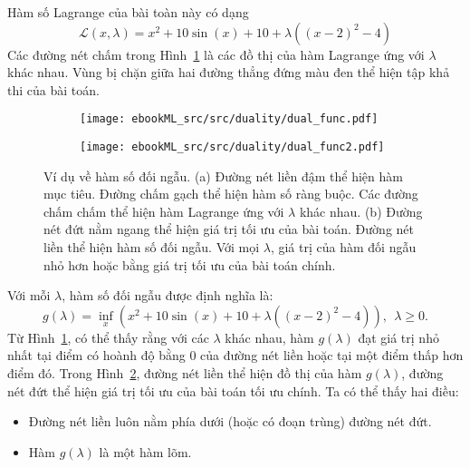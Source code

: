 Hàm số Lagrange của bài toàn này có dạng
\begin{equation*} 
\mathcal{L}(x, \lambda) = x^2 + 10\sin(x) +10+ \lambda((x-2)^2 - 4)  
\end{equation*} 
Các đường nét chấm trong Hình~\ref{fig:18_dualitya} là các đồ thị của hàm Lagrange ứng với
$\lambda$ khác nhau. Vùng bị chặn giữa hai đường thẳng đứng màu đen thể
hiện tập khả thi của bài toán.
\begin{figure}[t]
    \begin{subfigure}{0.48\textwidth}
    \texttt{[image: ebookML\_src/src/duality/dual\_func.pdf]}
    \caption{}
    \label{fig:18_dualitya}
    \end{subfigure}
    \begin{subfigure}{0.48\textwidth}
    \texttt{[image: ebookML\_src/src/duality/dual\_func2.pdf]}
    \caption{}
    \label{fig:18_dualityb}
    \end{subfigure}
    \caption{Ví dụ về hàm số đối ngẫu. (a) Đường nét liền đậm thể hiện hàm mục
    tiêu. Đường chấm gạch thể hiện hàm số ràng buộc. Các đường chấm chấm
    thể hiện hàm Lagrange ứng với $\lambda$ khác nhau. (b)
    Đường nét đứt nằm ngang thể hiện giá trị tối ưu của bài toán. Đường nét liền thể
    hiện hàm số đối ngẫu. Với mọi $\lambda$, giá trị của hàm đối ngẫu nhỏ
    hơn hoặc bằng giá trị tối ưu của bài toán chính.}
    \label{fig:18_duality}
\end{figure}

Với mỗi $\lambda$, hàm số đối ngẫu được định nghĩa là: 
\begin{equation*} 
g(\lambda) = \inf_{x} \left(x^2 + 10\sin(x) + 10+ \lambda((x-2)^2 - 4) \right), ~~ \lambda \geq 0. 
\end{equation*} 
Từ Hình~\ref{fig:18_dualitya}, có thể thấy rằng với các $\lambda$ khác
nhau, hàm $g(\lambda)$ đạt giá trị nhỏ nhất tại điểm có hoành độ bằng 0 của
đường nét liền hoặc tại một điểm thấp hơn điểm đó. Trong Hình~\ref{fig:18_dualityb}, đường nét liền thể hiện đồ thị của hàm $g(\lambda)$, đường nét đứt thể hiện
giá trị tối ưu của bài toán tối ưu chính. Ta có thể thấy hai
điều:
\begin{itemize}
    \item Đường nét liền luôn nằm phía dưới (hoặc có đoạn trùng) đường nét
    đứt.
     
    \item Hàm $g(\lambda)$ là một hàm lõm.
\end{itemize}

